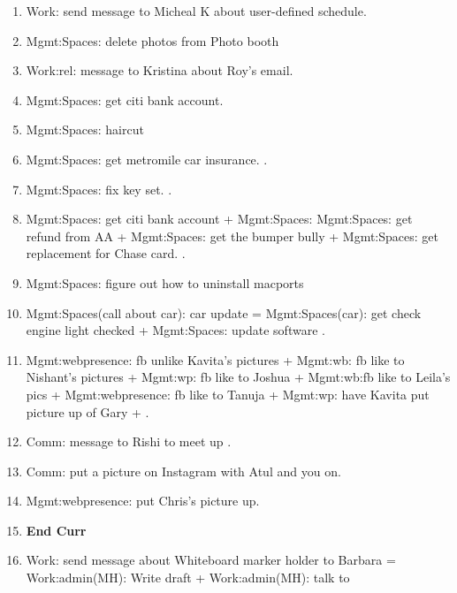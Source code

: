 \begin{enumerate}
        \item \tiny Work: send message to Micheal K about user-defined
          schedule.  


        \item \tiny Mgmt:Spaces: delete photos from Photo booth  
      
      \item \tiny Work:rel: message to Kristina about Roy's email.   
      \item \tiny Mgmt:Spaces: get citi bank account.  
      \item \tiny Mgmt:Spaces: haircut  
      \item \tiny Mgmt:Spaces: get metromile car insurance.   . 
      \item \tiny Mgmt:Spaces: fix key set. . 
      \item \tiny Mgmt:Spaces: get citi bank account +  Mgmt:Spaces:
        Mgmt:Spaces: get refund from AA  + Mgmt:Spaces: get the
        bumper bully +  Mgmt:Spaces: get replacement for Chase card. .
      \item \tiny Mgmt:Spaces: figure out how to uninstall macports 
        
      \item \tiny Mgmt:Spaces(call about car): car update = Mgmt:Spaces(car): get check engine light checked +
        Mgmt:Spaces: update software . 
        
      \item \tiny Mgmt:webpresence: fb unlike Kavita’s pictures + Mgmt:wb:
        fb like to Nishant's pictures +  Mgmt:wp: fb like to Joshua
        + Mgmt:wb:fb like to Leila's pics + Mgmt:webpresence: fb
        like to Tanuja + Mgmt:wp: have Kavita put picture up of Gary  + . 
        
      \item \tiny Comm: message to Rishi to meet up .
      \item \tiny Comm: put a picture on Instagram with Atul and you on. 
      \item \tiny Mgmt:webpresence: put Chris's picture up.
        
      \item \tiny  \textbf{End Curr} 
      \item \tiny Work: send message about Whiteboard marker holder to
        Barbara = Work:admin(MH): Write draft +
        Work:admin(MH): talk to 
        

\end{enumerate}
